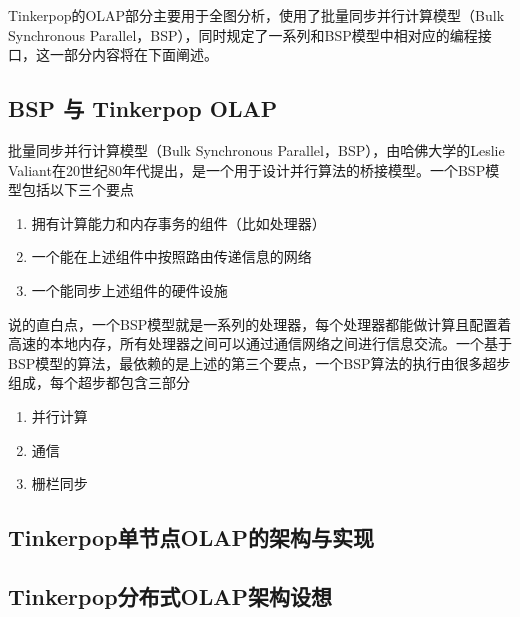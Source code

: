 \documentclass{article}
\begin{document}
Tinkerpop的OLAP部分主要用于全图分析，使用了批量同步并行计算模型（Bulk Synchronous Parallel，BSP），同时规定了一系列和BSP模型中相对应的编程接口，这一部分内容将在下面阐述。

\subsection{BSP 与 Tinkerpop OLAP}
批量同步并行计算模型（Bulk Synchronous Parallel，BSP），由哈佛大学的Leslie Valiant在20世纪80年代提出，是一个用于设计并行算法的桥接模型。一个BSP模型包括以下三个要点

\begin{enumerate}
\item 拥有计算能力和内存事务的组件（比如处理器）
\item 一个能在上述组件中按照路由传递信息的网络
\item 一个能同步上述组件的硬件设施
\end{enumerate}

说的直白点，一个BSP模型就是一系列的处理器，每个处理器都能做计算且配置着高速的本地内存，所有处理器之间可以通过通信网络之间进行信息交流。一个基于BSP模型的算法，最依赖的是上述的第三个要点，一个BSP算法的执行由很多超步组成，每个超步都包含三部分

\begin{enumerate}
\item 并行计算
\item 通信
\item 栅栏同步
\end{enumerate}

\subsection{Tinkerpop单节点OLAP的架构与实现}

\subsection{Tinkerpop分布式OLAP架构设想}
\end{document}
